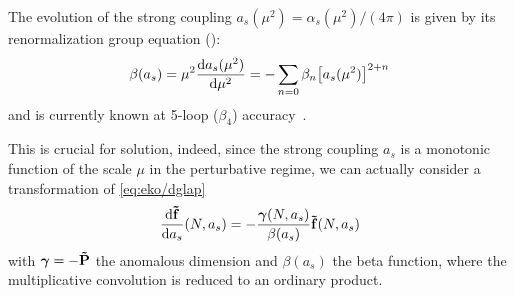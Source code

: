 The evolution of the strong coupling $a_s(\mu^2) = \alpha_s(\mu^2)/(4\pi)$
is given by its renormalization group equation (\rge):
\begin{equation}
    \beta(a_s) = \mu^2\dv{a_s(\mu^2)}{\mu^2}{} = - \sum\limits_{n=0} \beta_n \qty[a_s(\mu^2)]^{2+n}
\end{equation}
and is currently known at 5-loop ($\beta_4$)
accuracy~\cite{Herzog:2017ohr,Luthe:2016ima,Baikov:2016tgj,Chetyrkin:2017bjc,Luthe:2017ttg}.

This is crucial for \dglap{} solution, indeed, since the strong coupling $a_s$
is a monotonic function of the scale $\mu$ in the perturbative regime, we can
actually consider a transformation of
\cref{eq:eko/dglap}
\begin{equation}
    \dv{\vb{\tilde f}}{a_s}{}(N,a_s) = - \frac{\bm{\gamma}(N,a_s)}{\beta(a_s)} \vb {\tilde f}(N, a_s)
    \label{eq:eko/dglap2}
\end{equation}
with $\bm{\gamma} = - \vb{\tilde P}$ the anomalous dimension and $\beta(a_s)$
the \qcd{} beta function, where the multiplicative convolution is reduced to an
ordinary product.
